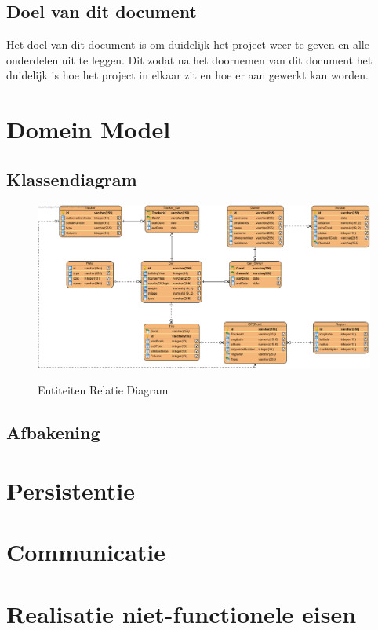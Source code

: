 \documentclass{scrreprt}
\begin{document}
	\section{Doel van dit document}
		Het doel van dit document is om duidelijk het project weer te geven en alle onderdelen uit te leggen. Dit zodat na het doornemen van dit document het duidelijk is hoe het project in elkaar zit en hoe er aan gewerkt kan worden.
	
	\newpage
	\chapter{Domein Model}
	\section{Klassendiagram}
	\begin{figure}[ht]
		\centering
		\includegraphics[draft]{erd-rekeningrijders}
		\label{fig:erd}
		\caption{Entiteiten Relatie Diagram}
	\end{figure}
		
	\section{Afbakening}
	
	\newpage
	\chapter{Persistentie}
	
	
	\newpage
	\chapter{Communicatie}
	
	\newpage
	\chapter{Realisatie niet-functionele eisen}
\end{document}
